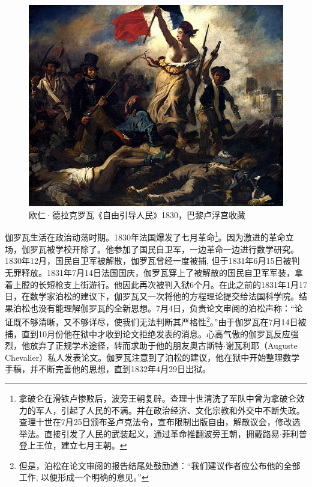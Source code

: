 \documentclass[b5paper]{ctexart}
\begin{document}
\begin{figure}[htbp]
 \centering
 \includegraphics[scale=0.4]{img/lltp.jpg}
 \captionsetup{labelformat=empty}
 \caption{欧仁·德拉克罗瓦《自由引导人民》1830，巴黎卢浮宫收藏}
 \label{fig:Liberty-Leading-the-People}
\end{figure}

伽罗瓦生活在政治动荡时期。1830年法国爆发了七月革命\footnote{拿破仑在滑铁卢惨败后，波旁王朝复辟。查理十世清洗了军队中曾为拿破仑效力的军人，引起了人民的不满。并在政治经济、文化宗教和外交中不断失政。查理十世在7月25日颁布圣卢克法令，宣布限制出版自由，解散议会，修改选举法。直接引发了人民的武装起义，通过革命推翻波旁王朝，拥戴路易$\cdot$菲利普登上王位，建立七月王朝。}。因为激进的革命立场，伽罗瓦被学校开除了。他参加了国民自卫军，一边革命一边进行数学研究。1830年12月，国民自卫军被解散，伽罗瓦曾经一度被捕, 但于1831年6月15日被判无罪释放。1831年7月14日法国国庆，伽罗瓦穿上了被解散的国民自卫军军装，拿着上膛的长短枪支上街游行。他因此再次被判入狱6个月。在此之前的1831年1月17日，在数学家泊松的建议下，伽罗瓦又一次将他的方程理论提交给法国科学院。结果泊松也没有能理解伽罗瓦的全新思想。7月4日，负责论文审阅的泊松声称：“论证既不够清晰，又不够详尽，使我们无法判断其严格性\footnote{但是，泊松在论文审阅的报告结尾处鼓励道：“我们建议作者应公布他的全部工作, 以便形成一个明确的意见。”}。”由于伽罗瓦在7月14日被捕，直到10月份他在狱中才收到论文拒绝发表的消息。心高气傲的伽罗瓦反应强烈，他放弃了正规学术途径，转而求助于他的朋友奥古斯特$\cdot$谢瓦利耶（Auguste Chevalier）私人发表论文。伽罗瓦注意到了泊松的建议，他在狱中开始整理数学手稿，并不断完善他的思想，直到1832年4月29日出狱。
\end{document}
